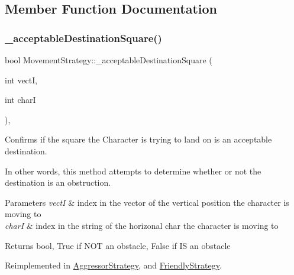 \subsection{Member Function Documentation}
\hypertarget{class_movement_strategy_a7767e4732545752f69dab06fe478152c}{}\label{class_movement_strategy_a7767e4732545752f69dab06fe478152c} 
\subsubsection{\texorpdfstring{\+\_\+acceptable\+Destination\+Square()}{\_acceptableDestinationSquare()}}
{\footnotesize\ttfamily bool Movement\+Strategy\+::\+\_\+acceptable\+Destination\+Square (\begin{DoxyParamCaption}\item[{int}]{vectI,  }\item[{int}]{charI }\end{DoxyParamCaption})\hspace{0.3cm}{\ttfamily [protected]}, {\ttfamily [virtual]}}

Confirms if the square the Character is trying to land on is an acceptable destination. 

In other words, this method attempts to determine whether or not the destination is an obstruction. 
\begin{DoxyParams}{Parameters}
{\em vectI} & index in the vector of the vertical position the character is moving to \\
\hline
{\em charI} & index in the string of the horizonal char the character is moving to \\
\hline
\end{DoxyParams}
\begin{DoxyReturn}{Returns}
bool, True if N\+OT an obstacle, False if IS an obstacle 
\end{DoxyReturn}


Reimplemented in \hyperlink{class_aggressor_strategy_a2bda41203cace4fbdbcb6a05bfd5243d}{Aggressor\+Strategy}, and \hyperlink{class_friendly_strategy_a7490a78b29add77bb9485899b05661b4}{Friendly\+Strategy}.

\hypertarget{class_movement_strategy_a17c50742bdde51e69223c49ec484bf95}{}\label{class_movement_strategy_a17c50742bdde51e69223c49ec484bf95} 

